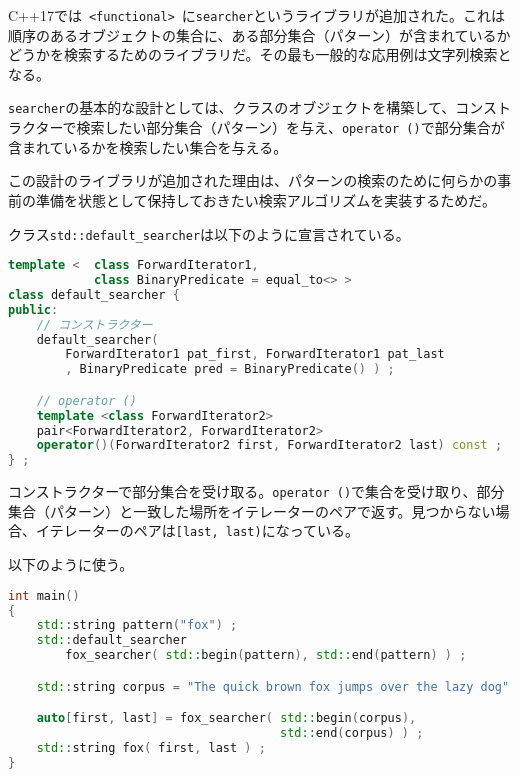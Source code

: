 %

C++17では~\lstinline!<functional>!~に\lstinline!searcher!というライブラリが追加された。これは順序のあるオブジェクトの集合に、ある部分集合（パターン）が含まれているかどうかを検索するためのライブラリだ。その最も一般的な応用例は文字列検索となる。

\lstinline!searcher!の基本的な設計としては、クラスのオブジェクトを構築して、コンストラクターで検索したい部分集合（パターン）を与え、\lstinline!operator ()!で部分集合が含まれているかを検索したい集合を与える。

この設計のライブラリが追加された理由は、パターンの検索のために何らかの事前の準備を状態として保持しておきたい検索アルゴリズムを実装するためだ。

%

クラス\lstinline!std::default_searcher!は以下のように宣言されている。

\begin{lstlisting}[language=C++]
template <  class ForwardIterator1,
            class BinaryPredicate = equal_to<> >
class default_searcher {
public:
    // コンストラクター
    default_searcher( 
        ForwardIterator1 pat_first, ForwardIterator1 pat_last
        , BinaryPredicate pred = BinaryPredicate() ) ;

    // operator ()
    template <class ForwardIterator2>
    pair<ForwardIterator2, ForwardIterator2>
    operator()(ForwardIterator2 first, ForwardIterator2 last) const ;
} ;
\end{lstlisting}

コンストラクターで部分集合を受け取る。\lstinline!operator ()!で集合を受け取り、部分集合（パターン）と一致した場所をイテレーターのペアで返す。見つからない場合、イテレーターのペアは\lstinline![last, last)!になっている。

以下のように使う。

\begin{lstlisting}[language=C++]
int main()
{
    std::string pattern("fox") ;
    std::default_searcher
        fox_searcher( std::begin(pattern), std::end(pattern) ) ;

    std::string corpus = "The quick brown fox jumps over the lazy dog" ;

    auto[first, last] = fox_searcher( std::begin(corpus),
                                      std::end(corpus) ) ;
    std::string fox( first, last ) ;
}
\end{lstlisting}

